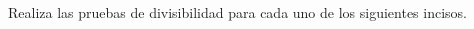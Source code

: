 \question[20] Realiza las pruebas de divisibilidad para cada uno de los siguientes incisos.
\begin{multicols}{2}
\begin{parts}
    {\printanswers
    
    }
    
    
    
    
    
    
    
    
    
\end{parts}
\end{multicols}